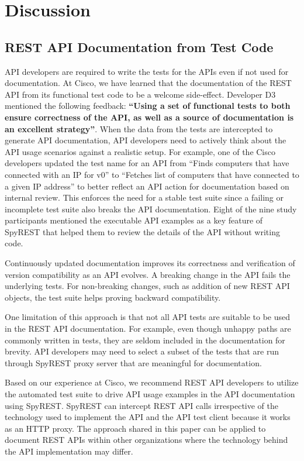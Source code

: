 \section{Discussion}

\subsection{REST API Documentation from Test Code}
API developers are required to write the tests for the APIs even if not used for documentation. At Cisco, we have learned that the documentation of the REST API from its functional test code to be a welcome side-effect. Developer D3 mentioned the following feedback: \textbf{``Using a set of functional tests to both ensure correctness of the API, as well as a source of documentation is an excellent strategy''}. When the data from the tests are intercepted to generate API documentation, API developers need to actively think about the API usage scenarios against a realistic setup. For example, one of the Cisco developers updated the test name for an API from ``Finds computers that have connected with an IP for v0'' to ``Fetches list of computers that have connected to a given IP address'' to better reflect an API action for documentation based on internal review. This enforces the need for a stable test suite since a failing or incomplete test suite also breaks the API documentation. Eight of the nine study participants mentioned the executable API examples as a key feature of SpyREST that helped them to review the details of the API without writing code.

Continuously updated documentation improves its correctness and verification of version compatibility as an API evolves. A breaking change in the API fails the underlying tests. For non-breaking changes, such as addition of new REST API objects, the test suite helps proving backward compatibility.

One limitation of this approach is that not all API tests are suitable to be used in the REST API documentation. For example, even though unhappy paths are commonly written in tests, they are seldom included in the documentation for brevity. API developers may need to select a subset of the tests that are run through SpyREST proxy server that are meaningful for documentation.

Based on our experience at Cisco, we recommend REST API developers to utilize the automated test suite to drive API usage examples in the API documentation using SpyREST. SpyREST can intercept REST API calls irrespective of the technology used to implement the API and the API test client because it works as an HTTP proxy. The approach shared in this paper can be applied to document REST APIs within other organizations where the technology behind the API implementation may differ.

